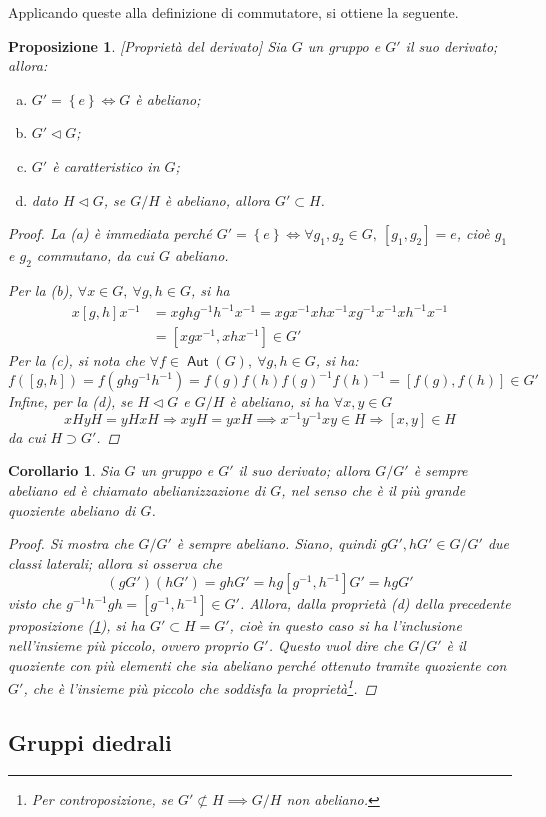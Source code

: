 \documentclass[11pt]{scrartcl}
\theoremstyle{style1}
\newtheorem{prop}{Proposizione}[section]
\newtheorem{corollario}{Corollario}[teorema]
\numberwithin{equation}{subsection}
\renewcommand{\operatorname}[1]{\mathop{\mathrm{\textsf{#1}}}}
\begin{document}
Applicando queste alla definizione di commutatore, si ottiene la seguente.
\begin{prop}\label{propderiv}
	[Propriet\`a del derivato]
	Sia $G$ un gruppo e $G'$ il suo derivato; allora:
	\begin{enumerate}[(a).]
		\item $G ' = \left\{ e \right\}  \iff G$ \`e abeliano;
		\item $G' \lhd G$;
		\item $G'$ \`e caratteristico in $G$;
		\item dato $H \lhd G$, se $G / H$ \`e abeliano, allora $G' \subset H$.
	\end{enumerate}
	\begin{proof}
		La (a) \`e immediata perch\'e $G' = \left\{ e \right\} \iff \forall g_1,g_2 \in G, \ [g_1,g_2] = e $, cio\`e $g_1$ e $g_2$ commutano, da cui $G$ abeliano.

		Per la (b), $\forall x \in G, \ \forall g,h \in G $, si ha 
		\[
			\begin{split}
				x[g,h]x^{-1}  &= xghg^{-1}h^{-1}x^{-1}= xgx^{-1}xhx^{-1}xg^{-1}x^{-1}xh^{-1}x^{-1}\\
					      &=[xgx^{-1}, xhx^{-1}] \in G'
			\end{split}
		\] 
	Per la (c), si nota che $\forall f \in \operatorname{Aut} (G), \ \forall g,h \in G$, si ha:
	\[
		f([g,h]) = f(ghg^{-1}h^{-1}) = f(g) f(h) f(g)^{-1} f(h)^{-1} = [f(g), f(h)] \in G'
	\] 
	Infine, per la (d), se $H \lhd G$ e $G / H$ \`e abeliano, si ha $\forall x,y \in G$
	\[
		xHyH =yH xH\Rightarrow xyH = yxH \implies x^{-1}y^{-1}xy \in H \Rightarrow [x,y] \in H
	\] 
	da cui $H \supset G' $.
	\end{proof}
\end{prop}
\begin{corollario}
	Sia $G$ un gruppo e $G'$ il suo derivato; allora $G / G'$ \`e sempre abeliano ed \`e chiamato \textit{abelianizzazione} di $G$, nel senso che \`e il pi\`u grande quoziente abeliano di $G$.
	\begin{proof}
		Si mostra che $G / G'$ \`e sempre abeliano. 
		Siano, quindi $gG', hG' \in G / G'$ due classi laterali; allora si osserva che
		\[
			(gG') (hG') = ghG' = hg [g^{-1},h^{-1}] G' = hg G'
		\] 
		visto che $g^{-1}h^{-1}gh=[g^{-1},h^{-1}] \in G'$.
		Allora, dalla propriet\`a (d) della precedente proposizione (\ref{propderiv}), si ha $G' \subset H =G'$, cio\`e in questo caso si ha l'inclusione nell'insieme pi\`u piccolo, ovvero proprio $G'$. 
		Questo vuol dire che $G /G'$ \`e il quoziente con pi\`u elementi che sia abeliano perch\'e ottenuto tramite quoziente con $G'$, che \`e l'insieme pi\`u piccolo che soddisfa la propriet\`a\footnote{Per controposizione, se $G'\not\subset H\implies G/H$ non abeliano.}.
	\end{proof}
\end{corollario}
\subsection{Gruppi diedrali}
\end{document}
